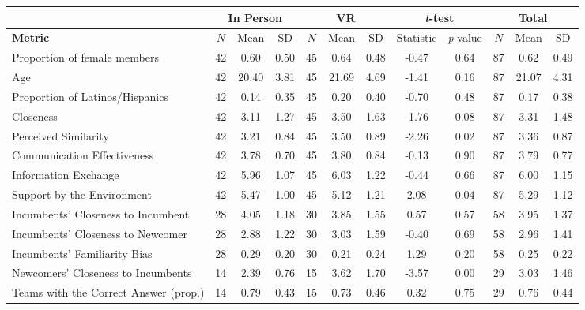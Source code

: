 \begin{table*}[!ht]
\centering
\small
\begin{tabular}{@{}l|ccc|ccc|cc|ccc@{}}
\toprule
& \multicolumn{3}{c}{\textbf{In Person}} & \multicolumn{3}{c}{\textbf{VR}} & \multicolumn{2}{c}{\textbf{\textit{t}-test}} & \multicolumn{3}{c}{\textbf{Total}} \\ \midrule
\textbf{Metric} & $N$ & Mean & SD & $N$ & Mean & SD & Statistic & \textit{p}-value & $N$ & Mean & SD \\ 
  \midrule
  Proportion of female members & 42 & 0.60 & 0.50 & 45 & 0.64 & 0.48 & -0.47 & 0.64 & 87 & 0.62 & 0.49 \\ 
  Age & 42 & 20.40 & 3.81 & 45 & 21.69 & 4.69 & -1.41 & 0.16 & 87 & 21.07 & 4.31 \\ 
  Proportion of Latinos/Hispanics & 42 & 0.14 & 0.35 & 45 & 0.20 & 0.40 & -0.70 & 0.48 & 87 & 0.17 & 0.38 \\ \midrule
  Closeness & 42 & 3.11 & 1.27 & 45 & 3.50 & 1.63 & -1.76 & 0.08 & 87 & 3.31 & 1.48 \\ 
  Perceived Similarity & 42 & 3.21 & 0.84 & 45 & 3.50 & 0.89 & -2.26 & 0.02 & 87 & 3.36 & 0.87 \\ 
  Communication Effectiveness & 42 & 3.78 & 0.70 & 45 & 3.80 & 0.84 & -0.13 & 0.90 & 87 & 3.79 & 0.77 \\ 
  Information Exchange & 42 & 5.96 & 1.07 & 45 & 6.03 & 1.22 & -0.44 & 0.66 & 87 & 6.00 & 1.15 \\ 
  Support by the Environment & 42 & 5.47 & 1.00 & 45 & 5.12 & 1.21 & 2.08 & 0.04 & 87 & 5.29 & 1.12 \\ \midrule
  Incumbents' Closeness to Incumbent & 28 & 4.05 & 1.18 & 30 & 3.85 & 1.55 & 0.57 & 0.57 & 58 & 3.95 & 1.37 \\
  Incumbents' Closeness to Newcomer & 28 & 2.88 & 1.22 & 30 & 3.03 & 1.59 & -0.40 & 0.69 & 58 & 2.96 & 1.41 \\
  Incumbents' Familiarity Bias & 28 & 0.29 & 0.20 & 30 & 0.21 & 0.24 & 1.29 & 0.20 & 58 & 0.25 & 0.22 \\
  Newcomers' Closeness to Incumbents & 14 & 2.39 & 0.76 & 15 & 3.62 & 1.70 & -3.57 & 0.00 & 29 & 3.03 & 1.46 \\ \midrule
  Teams with the Correct Answer (prop.) & 14 & 0.79 & 0.43 & 15 & 0.73 & 0.46 & 0.32 & 0.75 & 29 & 0.76 & 0.44 \\ 
\bottomrule
\end{tabular}

\end{table*}
